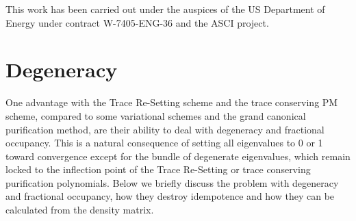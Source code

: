 \commentoutA{\documentclass[prb,aps,twocolumn,showpacs,twocolumngrid,superbib]{revtex4}}
\begin{document}
\begin{acknowledgments}
This work has been carried out under the auspices of the US Department 
of Energy under contract W-7405-ENG-36 and the ASCI project.  
\end{acknowledgments}




\appendix

\section{Degeneracy}\label{Degen}

One advantage with the Trace Re-Setting scheme and the trace
conserving PM scheme, compared to some variational schemes \cite{XLi93}
and the grand canonical purification method,
are their ability to deal with degeneracy and fractional occupancy.
This is a natural consequence of setting all eigenvalues to 0 or 1 
toward convergence except for the bundle of degenerate eigenvalues, which 
remain locked to the inflection point of the Trace Re-Setting or trace conserving purification 
polynomials. Below we briefly discuss the problem with degeneracy and fractional
occupancy, how they destroy idempotence and how they can be calculated
from the density matrix.
\end{document}
